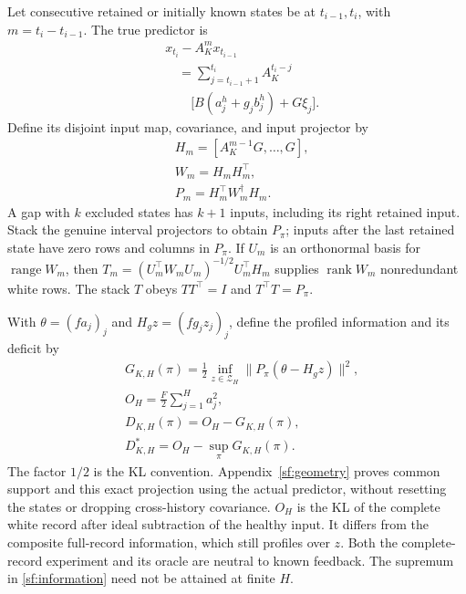 \documentclass[journal]{IEEEtran}
\begin{document}
Let consecutive retained or initially known states be at $t_{i-1},t_i$,
with $m=t_i-t_{i-1}$. The true predictor is
\begin{equation}\label{sf:predictor}
\begin{aligned}
&x_{t_i}-A_K^m x_{t_{i-1}}\\
&\quad=\sum_{j=t_{i-1}+1}^{t_i}A_K^{t_i-j}\\
&\qquad\bigl[B(a_j^h+g_jb_j^h)+G\xi_j\bigr].
\end{aligned}
\end{equation}
Define its disjoint input map, covariance, and input projector by
\begin{equation}\label{sf:interval}
\begin{aligned}
&H_m=[A_K^{m-1}G,\ldots,G],\\
&W_m=H_mH_m^\top,\\
&P_m=H_m^\top W_m^\dagger H_m .
\end{aligned}
\end{equation}
A gap with $k$ excluded states has $k+1$ inputs, including its right retained
input. Stack the genuine interval projectors to obtain $P_\pi$; inputs after
the last retained state have zero rows and columns in $P_\pi$.
If $U_m$ is an orthonormal basis for $\operatorname{range}W_m$, then
$T_m=(U_m^\top W_mU_m)^{-1/2}U_m^\top H_m$ supplies
$\operatorname{rank}W_m$ nonredundant white rows. The stack $T$ obeys
$TT^\top=I$ and $T^\top T=P_\pi$.

With $\theta=(fa_j)_j$ and $H_gz=(fg_jz_j)_j$, define the profiled information
and its deficit by
\begin{equation}\label{sf:information}
\begin{aligned}
&G_{K,H}(\pi)=\tfrac12\inf_{z\in\mathcal Z_H}\|P_\pi(\theta-H_gz)\|^2,\\
&O_H=\tfrac F2\sum_{j=1}^Ha_j^2,\\
&D_{K,H}(\pi)=O_H-G_{K,H}(\pi),\\
&D_{K,H}^*=O_H-\sup_\pi G_{K,H}(\pi).
\end{aligned}
\end{equation}
The factor $1/2$ is the KL convention. Appendix~\ref{sf:geometry} proves
common support and this exact projection using the actual predictor,
without resetting the states or dropping cross-history covariance.
$O_H$ is the KL of the complete white record after ideal subtraction of
the healthy input. It differs from the composite full-record information,
which still profiles over $z$. Both the complete-record experiment and its
oracle are neutral to known feedback. The supremum in
\eqref{sf:information} need not be attained at finite $H$.
\end{document}
